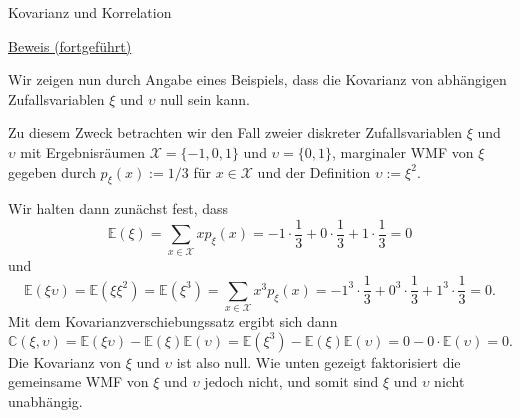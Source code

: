 \documentclass[
  8pt,
  ignorenonframetext,
]{beamer}
\newcommand{\ups}{\upsilon}
\begin{document}
\begin{frame}{Kovarianz und Korrelation}
\protect\hypertarget{kovarianz-und-korrelation-5}{}
\footnotesize

\underline{Beweis (fortgeführt)} \vspace{2mm}

Wir zeigen nun durch Angabe eines Beispiels, dass die Kovarianz von
abhängigen Zufallsvariablen \(\xi\) und \(\ups\) null sein kann.

Zu diesem Zweck betrachten wir den Fall zweier diskreter
Zufallsvariablen \(\xi\) und \(\ups\) mit Ergebnisräumen
\(\mathcal{X} = \{-1,0,1\}\) und \(\mathcal{\ups} = \{0,1\}\),
marginaler WMF von \(\xi\) gegeben durch \(p_\xi(x) := 1/3\) für
\(x \in \mathcal{X}\) und der Definition \(\ups := \xi^2\).

Wir halten dann zunächst fest, dass \begin{equation}
\mathbb{E}(\xi)
= \sum_{x \in \mathcal{X}} x p_\xi(x)
= -1 \cdot \frac{1}{3} + 0\cdot \frac{1}{3} + 1\cdot\frac{1}{3}
= 0
\end{equation} und \begin{equation}
\mathbb{E}(\xi\ups)
= \mathbb{E}(\xi\xi^2)
= \mathbb{E}(\xi^3)
= \sum_{x \in \mathcal{X}} x^3 p_\xi(x)
= -1^3 \cdot \frac{1}{3} + 0^3\cdot \frac{1}{3} + 1^3\cdot\frac{1}{3}
= 0.
\end{equation} Mit dem Kovarianzverschiebungssatz ergibt sich dann
\begin{equation}
\mathbb{C}(\xi,\ups)
= \mathbb{E}(\xi\ups) - \mathbb{E}(\xi)\mathbb{E}(\ups)
= \mathbb{E}(\xi^3) - \mathbb{E}(\xi)\mathbb{E}(\ups)
= 0 - 0\cdot \mathbb{E}(\ups)
= 0.
\end{equation} Die Kovarianz von \(\xi\) und \(\ups\) ist also null. Wie
unten gezeigt faktorisiert die gemeinsame WMF von \(\xi\) und \(\ups\)
jedoch nicht, und somit sind \(\xi\) und \(\ups\) nicht unabhängig.
\end{frame}
\end{document}
